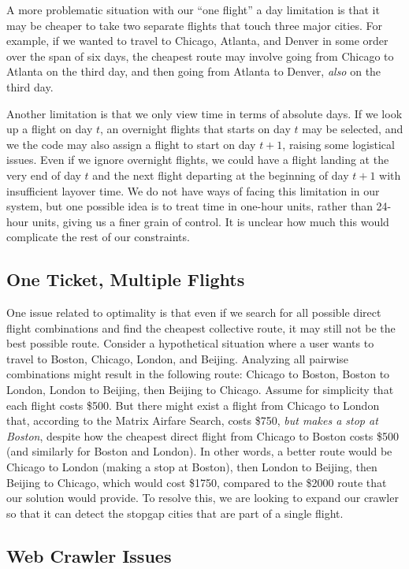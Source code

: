 \documentclass{article}
\begin{document}
A more problematic situation with our ``one flight'' a day limitation is that it may be cheaper to take two separate flights that touch three major
cities. For example, if we wanted to travel to Chicago, Atlanta, and Denver in some order over the span of six days, the cheapest route may involve
going from Chicago to Atlanta on the third day, and then going from Atlanta to Denver, \emph{also} on the third day.

Another limitation is that we only view time in terms of absolute days. If we look up a flight on day $t$, an overnight flights that starts on day $t$
may be selected, and we the code may also assign a flight to start on day $t+1$, raising some logistical issues. Even if we ignore overnight flights,
we could have a flight landing at the very end of day $t$ and the next flight departing at the beginning of day $t+1$ with insufficient layover time.
We do not have ways of facing this limitation in our system, but one possible idea is to treat time in one-hour units, rather than 24-hour units,
giving us a finer grain of control. It is unclear how much this would complicate the rest of our constraints.

\subsection{One Ticket, Multiple Flights}

One issue related to optimality is that even if we search for all possible direct flight combinations and find the cheapest collective route, it may
still not be the best possible route. Consider a hypothetical situation where a user wants to travel to Boston, Chicago, London, and Beijing.
Analyzing all pairwise combinations might result in the following route: Chicago to Boston, Boston to London, London to Beijing, then Beijing to
Chicago.  Assume for simplicity that each flight costs \$500. But there might exist a flight from Chicago to London that, according to the Matrix
Airfare Search, costs \$750, \emph{but makes a stop at Boston}, despite how the cheapest direct flight from Chicago to Boston costs \$500 (and
similarly for Boston and London). In other words, a better route would be Chicago to London (making a stop at Boston), then London to Beijing, then
Beijing to Chicago, which would cost \$1750, compared to the \$2000 route that our solution would provide. To resolve this, we are looking to expand
our crawler so that it can detect the stopgap cities that are part of a single flight.

\subsection{Web Crawler Issues}
\end{document}
